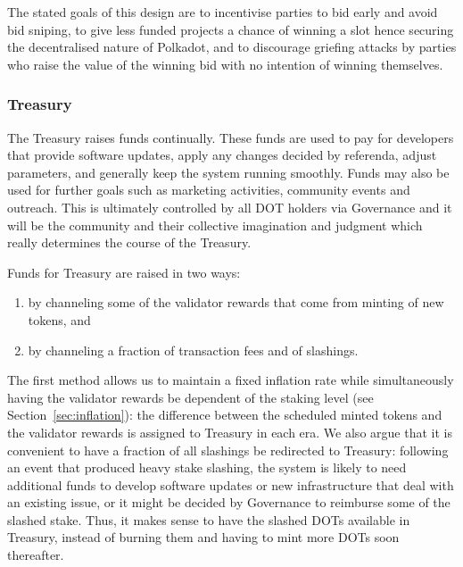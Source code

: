 \documentclass{article}
\begin{document}
The stated goals of this design are to incentivise parties to bid early and avoid bid sniping, to give less funded projects a chance of winning a slot hence securing the decentralised nature of Polkadot, and to discourage griefing attacks by parties who raise the value of the winning bid with no intention of winning themselves.

\subsubsection{Treasury}\label{sec:treasury}

The Treasury raises funds continually. These funds are used to pay for developers that provide software updates, apply any changes decided by referenda, adjust parameters, and generally keep the system running smoothly. Funds may also be used for further goals such as marketing activities, community events and outreach. This is ultimately controlled by all DOT holders via Governance and it will be the community and their collective imagination and judgment which really determines the course of the Treasury.

Funds for Treasury are raised in two ways:

\begin{enumerate}
	\item by channeling some of the validator rewards that come from minting of new tokens, and 
	\item by channeling a fraction of transaction fees and of slashings.
\end{enumerate}


The first method allows us to maintain a fixed inflation rate while simultaneously having the validator rewards be dependent of the staking level (see Section~\ref{sec:inflation}): the difference between the scheduled minted tokens and the validator rewards is assigned to Treasury in each era. 
We also argue that it is convenient to have a fraction of all slashings be redirected to Treasury: following an event that produced heavy stake slashing, the system is likely to need additional funds to develop software updates or new infrastructure that deal with an existing issue, or it might be decided by Governance to reimburse some of the slashed stake. Thus, it makes sense to have the slashed DOTs available in Treasury, instead of burning them and having to mint more DOTs soon thereafter.
\end{document}
